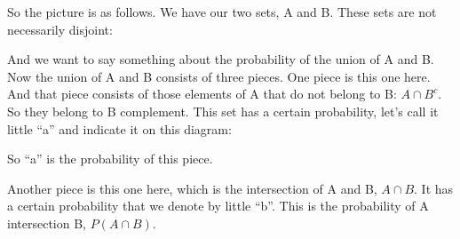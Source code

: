 \documentclass[pdftex, brazil, 12pt, twoside]{article}
\begin{document}
So the picture is as follows.
We have our two sets, A and B. These sets are
not necessarily disjoint:

\begin{figure}[H]
  \begin{center}
  \end{center}
\end{figure}

And we want to say something about the probability of the
union of A and B.
Now the union of A and B consists of three pieces.
One piece is this one here.
And that piece consists of those elements of A that do
not belong to B: $A \cap B^c$. So they belong to B complement.
This set has a certain probability, let's call it
little ``a'' and indicate it on this diagram:

\begin{figure}[H]
  \begin{center}
  \end{center}
\end{figure}

So ``a'' is the probability of this piece.

Another piece is this one here, which is the
intersection of A and B, $A \cap B$. It has a certain probability that
we denote by little ``b''.
This is the probability of A intersection B, $P(A \cap B)$.

\begin{figure}[H]
  \begin{center}
  \end{center}
\end{figure}
\end{document}
